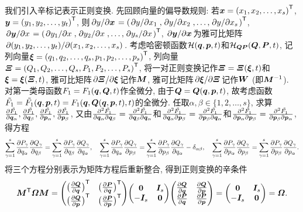 \begin{proposition}[辛标记]\label{pro:辛标记}
    我们引入辛标记表示正则变换. 先回顾向量的偏导数规则: 若$ \vb*{x}={(x_1,x_2,\ldots,x_s)}^{\mathsf{T}} $, $ \vb*{y}={(y_1,y_2,\ldots,y_t)}^{\mathsf{T}} $, 则$ \pdv*{y}{\vb*{x}}={(\pdv*{y}{x_1},\pdv*{y}{x_2},\ldots,\pdv*{y}{x_s})}^{\mathsf{T}} $, $ \pdv*{\vb*{y}}{x}={(\pdv*{y_1}{x},\pdv*{y_2}{x},\ldots,\pdv*{y_s}{x})}^{\mathsf{T}} $, $ \pdv*{\vb*{y}}{\vb*{x}} $为雅可比矩阵$ \pdv*{(y_1,y_2,\ldots,y_t)}{(x_1,x_2,\ldots,x_s)} $. 考虑哈密顿函数$ \mathcal{H}(\vb*{q},\vb*{p},t) $和$ \mathcal{H}_{\vb*{QP}}(\vb*{Q},\vb*{P},t) $, 记列向量$ \vb*{\xi}={(q_1,q_2,\ldots,q_s,p_1,p_2,\ldots,p_s)}^{\mathsf{T}} $, 列向量$ \vb*{\varXi}={(Q_1,Q_2,\ldots,Q_s,P_1,P_2,\ldots,P_s)}^{\mathsf{T}} $, 将一对正则变换记作$ \vb*{\varXi}=\vb*{\varXi}(\vb*{\xi},t) $和$ \vb*{\xi}=\vb*{\xi}(\vb*{\varXi},t) $, 雅可比矩阵$ \pdv*{\vb*{\varXi}}{\vb*{\xi}} $记作$ \vb*{M} $, 雅可比矩阵$ \pdv*{\vb*{\xi}}{\vb*{\varXi}} $记作$ \vb*{W} $ (即$ \vb*{M}^{-1} $). 对第一类母函数$ F_1=F_1(\vb*{q},\vb*{Q},t) $作全微分, 由于$ \vb*{Q}=\vb*{Q}(\vb*{q},\vb*{p},t) $, 故考虑函数$ \tilde{F_1}=\tilde{F_1}(\vb*{q},\vb*{p},t)=F_1(\vb*{q},\vb*{Q}(\vb*{q},\vb*{p},t),t) $的全微分. 任取$ \alpha,\beta \in \{1,2,\ldots,s\} $, 求算$ \pdv{\tilde{F_1}}{\vb*{q}_{\alpha}},\pdv{\tilde{F_1}}{\vb*{q}_{\beta}},\pdv{\tilde{F_1}}{\vb*{p}_{\alpha}},\pdv{\tilde{F_1}}{\vb*{p}_{\beta}} $, 又由$ \pdv{\tilde{F_1}}{\vb*{q}_{\alpha}}{\vb*{q}_{\beta}}=\pdv{\tilde{F_1}}{\vb*{q}_{\beta}}{\vb*{q}_{\alpha}} $和$ \pdv{\tilde{F_1}}{\vb*{q}_{\alpha}}{\vb*{p}_{\beta}}=\pdv{\tilde{F_1}}{\vb*{p}_{\beta}}{\vb*{q}_{\alpha}} $和$ \pdv{\tilde{F_1}}{\vb*{p}_{\alpha}}{\vb*{p}_{\beta}}=\pdv{\tilde{F_1}}{\vb*{p}_{\beta}}{\vb*{p}_{\alpha}} $, 得方程
    \begin{equation*}
        \sum_{\gamma=1}^s \pdv{P_{\gamma}}{q_{\alpha}}\pdv{Q_{\gamma}}{q_{\beta}} = \sum_{\gamma=1}^s \pdv{P_{\gamma}}{q_{\beta}}\pdv{Q_{\gamma}}{q_{\alpha}}, \quad
        \sum_{\gamma=1}^s \pdv{P_{\gamma}}{q_{\alpha}}\pdv{Q_{\gamma}}{p_{\beta}} = \sum_{\gamma=1}^s \pdv{P_{\gamma}}{p_{\beta}}\pdv{Q_{\gamma}}{q_{\alpha}} - \delta_{\alpha\beta}, \quad
        \sum_{\gamma=1}^s \pdv{P_{\gamma}}{p_{\alpha}}\pdv{Q_{\gamma}}{p_{\beta}} = \sum_{\gamma=1}^s \pdv{P_{\gamma}}{p_{\beta}}\pdv{Q_{\gamma}}{p_{\alpha}}.
    \end{equation*}
    将三个方程分别表示为矩阵方程后重新整合, 得到正则变换的辛条件
    \begin{equation}
        \transpose{\vb*{M}}\vb*{\varOmega}\vb*{M} = \mqty(\transpose{\big(\pdv{\vb*{Q}}{\vb*{q}}\big)} & \transpose{\big(\pdv{\vb*{P}}{\vb*{q}}\big)} \\ \transpose{\big(\pdv{\vb*{Q}}{\vb*{p}}\big)} & \transpose{\big(\pdv{\vb*{P}}{\vb*{p}}\big)}) \mqty(\vb*{0} & \vb*{I}_s\\ -\vb*{I}_s & \vb*{0}) \mqty(\pdv{\vb*{Q}}{\vb*{q}} & \pdv{\vb*{Q}}{\vb*{p}} \\ \pdv{\vb*{P}}{\vb*{q}} & \pdv{\vb*{P}}{\vb*{p}}) = \mqty(\vb*{0} & \vb*{I}_s\\ -\vb*{I}_s & \vb*{0}) = \vb*{\varOmega}.

\end{equation}
\end{proposition}
